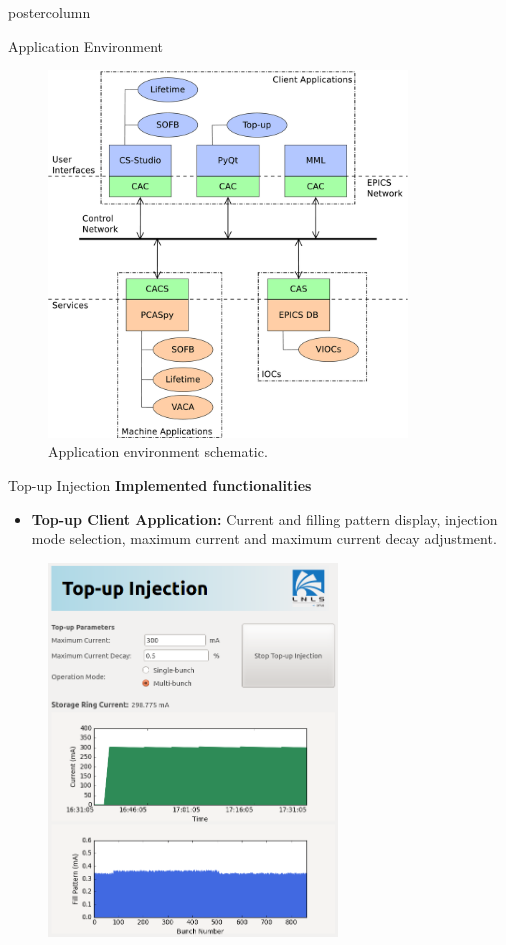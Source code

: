 \documentclass{beamer}
\begin{document}
\begin{frame}
\begin{columns}
\begin{column}{0.45\textwidth}
\begin{beamercolorbox}[center]{postercolumn}
\begin{minipage}{.98\textwidth}
{\begin{myblock}{Application Environment}
\begin{figure}
							\includegraphics[width=0.85\textwidth]{../WEPOPRPO22f1.eps}
							\caption{Application environment schematic.}
						\end{figure}
					\end{myblock}
					\begin{myblock}{Top-up Injection}
						\textbf{Implemented functionalities}
						\begin{itemize}
							\item \textbf{Top-up Client Application:} Current and filling pattern display, injection mode selection, maximum current and maximum current decay adjustment.
						\end{itemize}
						\vspace{0.5cm}
						\begin{figure}
							\centering
							\includegraphics[width=0.684\textwidth]{../WEPOPRPO22f4.png}

\end{figure}
\end{myblock}}
\end{minipage}
\end{beamercolorbox}
\end{column}
\end{columns}
\end{frame}
\end{document}
